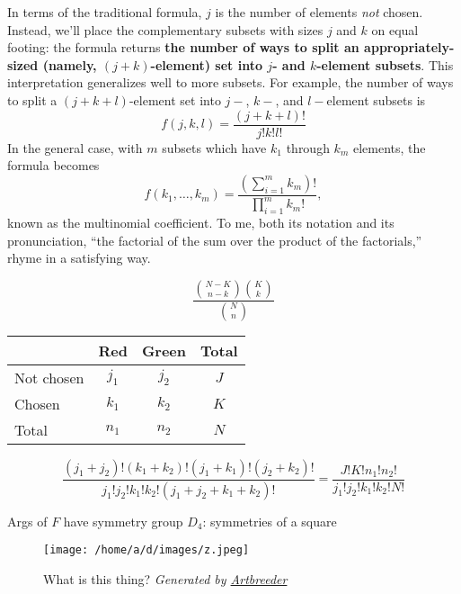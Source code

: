 \documentclass{article}
\begin{document}
In terms of the traditional formula,
$j$ is the number of elements \textit{not} chosen.
Instead, we'll place the complementary subsets
with sizes $j$ and $k$ on equal footing: the formula returns
\textbf{the number of ways to split an appropriately-sized (namely, $(j+k)$-element) set
  into $j$- and $k$-element subsets}.
This interpretation generalizes well to more subsets.
For example, the number of ways to split a $(j+k+l)$-element set
into $j-$, $k-$, and $l-$element subsets is
\[f(j, k, l) = \frac{(j+k+l)!}{j!k!l!}\]
In the general case, with $m$ subsets which have $k_1$ through $k_m$ elements,
the formula becomes
\[f(k_1, \ldots, k_m) = \frac{\left(\sum\limits_{i=1}^{m}k_m\right)!}{\prod\limits_{i=1}^{m}k_m!},\]
known as the multinomial coefficient.
To me, both its notation and its pronunciation,
``the factorial of the sum over the product of the factorials,''
rhyme in a satisfying way.

\newpage

\[\frac{{N-K \choose n-k}{K \choose k}}{{N \choose n}}\]

\begin{tabular}{|l|c|c|c|}
  \hline
  & Red & Green & Total \\ \hline
  Not chosen & $j_1$ & $j_2$ & $J$ \\ \hline
  Chosen & $k_1$ & $k_2$ & $K$ \\ \hline
  Total & $n_1$ & $n_2$ & $N$ \\ \hline
\end{tabular}

\[
\frac{(j_1+j_2)!(k_1+k_2)!(j_1+k_1)!(j_2+k_2)!}{j_1!j_2!k_1!k_2!(j_1+j_2+k_1+k_2)!}
=\frac{J!K!n_1!n_2!}{j_1!j_2!k_1!k_2!N!}
\]

Args of $F$ have symmetry group $D_4$: symmetries of a square

\begin{figure}[H]
  \centering
  \texttt{[image: /home/a/d/images/z.jpeg]}
  \caption*{What is this thing? \textit{Generated by \href{https://artbreeder.com}{Artbreeder}}}
\end{figure}

\newpage
\end{document}

